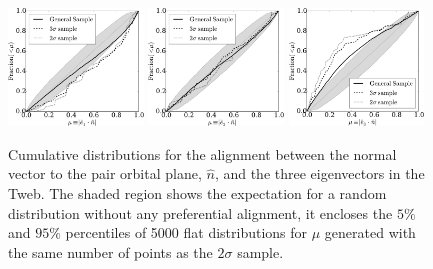 \documentclass{emulateapj}
\begin{document}
\begin{figure}
\begin{center}
  \includegraphics[width=0.32\textwidth]{fig3a.pdf}
  \includegraphics[width=0.32\textwidth]{fig3b.pdf}
  \includegraphics[width=0.32\textwidth]{fig3c.pdf}
\end{center}
\caption{Cumulative distributions for the alignment between the normal
  vector to the pair orbital plane, $\hat{n}$, and the three eigenvectors in
  the Tweb. 
The shaded region shows the expectation for a random
  distribution without any preferential alignment, it encloses the $5\%$ and $95\%$ percentiles of 5000
  flat distributions for $\mu$ generated with the  same number of
  points as the $2\sigma$ sample.  
    \label{fig:alignment_n}}  
\end{figure}
\end{document}
